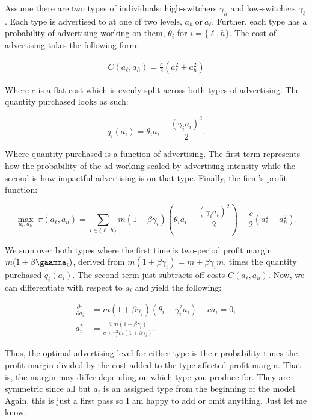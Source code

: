 \documentclass[11pt]{article}
\theoremstyle{definition}
\theoremstyle{remark}
\begin{document}
Assume there are two types of individuals: high-switchers $\gamma_h$ and low-switchers $\gamma_{\ell}$. Each type is advertised to at one of two levels, $a_h \ \text{or} \ a_{\ell}$. Further, each type has a probability of advertising working on them, $\theta_i$ for $i = \{\ell,h\}$. The cost of advertising takes the following form:

\begin{align*}
  C(a_{\ell}, a_h) = \frac{c}{2}(a_{\ell}^2 + a_h^2)
\end{align*}

Where $c$ is a flat cost which is evenly split across both types of advertising. The quantity purchased looks as such:

\begin{equation*}
q_i(a_i)
=
\theta_i a_i-\frac{(\gamma_i a_i)^2}{2}.
\end{equation*}

Where quantity purchased is a function of advertising. The first term represents how the probability of the ad working scaled by advertising intensity while the second is how impactful advertising is on that type. Finally, the firm's profit function:

\begin{equation*}
\max_{a_\ell,a_h} \;
\pi(a_\ell,a_h)
=
\sum_{i\in\{\ell,h\}}
m(1+\beta\gamma_i)
\left(
\theta_i a_i-\frac{(\gamma_i a_i)^2}{2}
\right)
-\frac{c}{2}(a_\ell^2+a_h^2).
\end{equation*}

We sum over both types where the first time is two-period profit margin $m(1+\beta\gaamma_i)$, derived from $m(1+\beta\gamma_i) = m + \beta\gamma_i m$, times the quantity purchased $q_i(a_i)$. The second term just subtracts off costs $C(a_{\ell}, a_h)$. Now, we can differentiate with respect to $a_i$ and yield the following:

\begin{align*}
\frac{\partial \pi}{\partial a_i}
&= m(1+\beta\gamma_i)(\theta_i-\gamma_i^2a_i)-ca_i=0, \\[4pt]
a_i^*
&= \frac{\theta_i m(1+\beta\gamma_i)}
{c+\gamma_i^2m(1+\beta\gamma_i)}.
\end{align*}

Thus, the optimal advertising level for either type is their probability times the profit margin divided by the cost added to the type-affected profit margin. That is, the margin may differ depending on which type you produce for. They are symmetric since all but $a_i$ is an assigned type from the beginning of the model. Again, this is just a first pass so I am happy to add or omit anything. Just let me know.
\end{document}
